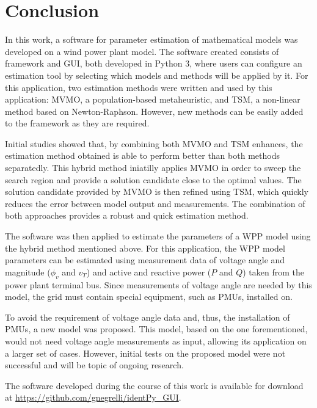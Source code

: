 \chapter{Conclusion}
\label{ch: Conclusion}

In this work, a software for parameter estimation of mathematical models was developed on a wind power plant model. The software created consists of framework and GUI, both developed in Python 3, where users can configure an estimation tool by selecting which models and methods will be applied by it. For this application, two estimation methods were written and used by this application: MVMO, a population-based metaheuristic, and TSM, a non-linear method based on Newton-Raphson. However, new methods can be easily added to the framework as they are required.

Initial studies showed that, by combining both MVMO and TSM enhances, the estimation method obtained is able to perform better than both methods separatedly. This hybrid method iniatilly applies MVMO in order to sweep the search region and provide a solution candidate close to the optimal values. The solution candidate provided by MVMO is then refined using TSM, which quickly reduces the error between model output and measurements. The combination of both approaches provides a robust and quick estimation method.

The software was then applied to estimate the parameters of a WPP model using the hybrid method mentioned above. For this application, the WPP model parameters can be estimated using measurement data of voltage angle and magnitude ($\phi_{v}$ and $v_{T}$) and active and reactive power ($P$ and $Q$) taken from the power plant terminal bus. Since measurements of voltage angle are needed by this model, the grid must contain special equipment, such as PMUs, installed on.

To avoid the requirement of voltage angle data and, thus, the installation of PMUs, a new model was proposed. This model, based on the one forementioned, would not need voltage angle measurements as input, allowing its application on a larger set of cases. However, initial tests on the proposed model were not successful and will be topic of ongoing research.

The software developed during the course of this work is available for download at \href{https://github.com/gnegrelli/identPy\_GUI}{https://github.com/gnegrelli/identPy\_GUI}.